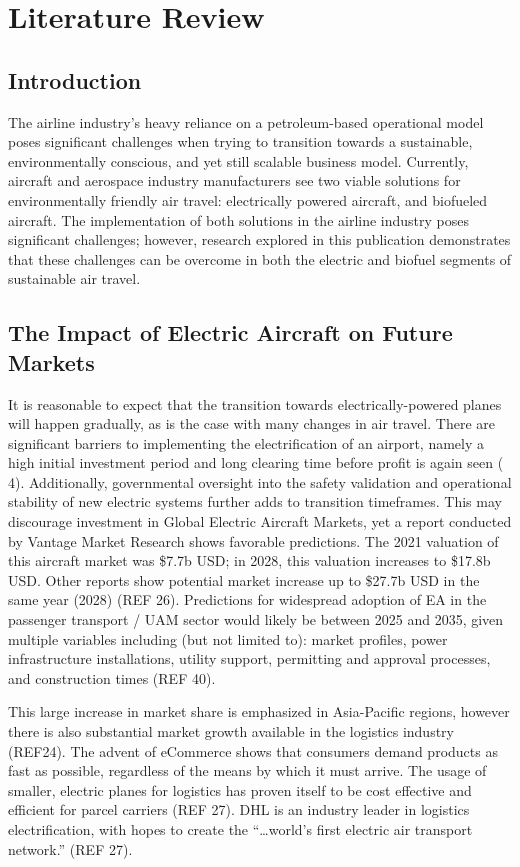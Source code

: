 \documentclass[../main.tex]{subfiles}
\begin{document}
\section{Literature Review}\label{litReview}
\subsection{Introduction}\label{designIntro}
The airline industry’s heavy reliance on a petroleum-based operational model poses significant challenges when trying to transition towards a sustainable, environmentally conscious, and yet still scalable business model. Currently, aircraft and aerospace industry manufacturers see two viable solutions for environmentally friendly air travel: electrically powered aircraft, and biofueled aircraft. The implementation of both solutions in the airline industry poses significant challenges; however, research explored in this publication demonstrates that these challenges can be overcome in both the electric and biofuel segments of sustainable air travel.\par
\subsection{The Impact of Electric Aircraft on Future Markets}
It is reasonable to expect that the transition towards electrically-powered planes will happen gradually, as is the case with many changes in air travel. There are significant barriers to implementing the electrification of an airport, namely a high initial investment period and long clearing time before profit is again seen (
4).  Additionally, governmental oversight into the safety validation and operational stability of new electric systems further adds to transition timeframes.\cite{ref24} This may discourage investment in Global Electric Aircraft Markets, yet a report conducted by Vantage Market Research shows favorable predictions. The 2021 valuation of this aircraft market was \$7.7b USD; in 2028, this valuation increases to \$17.8b USD. Other reports show potential market increase up to \$27.7b USD in the same year (2028) (REF 26). Predictions for widespread adoption of EA in the passenger transport / UAM sector would likely be between 2025 and 2035, given multiple variables including (but not limited to): market profiles, power infrastructure installations, utility support, permitting and approval processes, and construction times (REF 40).\par
This large increase in market share is emphasized in Asia-Pacific regions, however there is also substantial market growth available in the logistics industry (REF24). The advent of eCommerce shows that consumers demand products as fast as possible, regardless of the means by which it must arrive. The usage of smaller, electric planes for logistics has proven itself to be cost effective and efficient for parcel carriers (REF 27). DHL is an industry leader in logistics electrification, with hopes to create the “…world’s first electric air transport network.” (REF 27).\par
\end{document}
